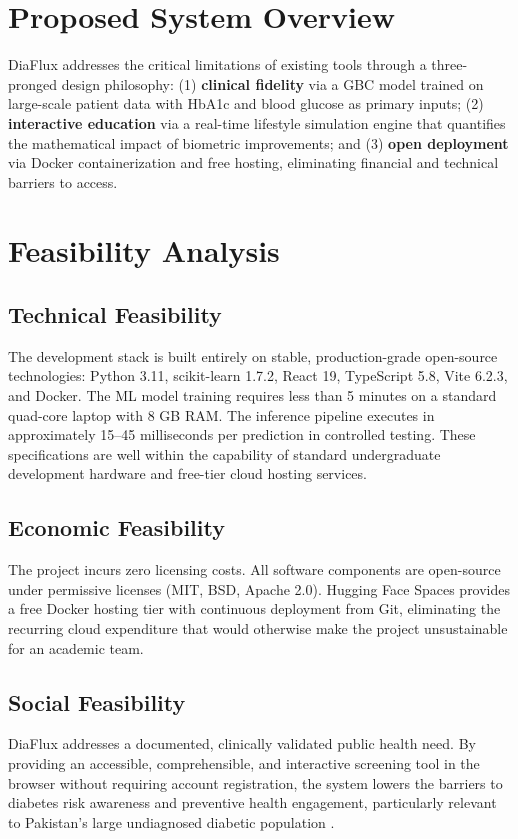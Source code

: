 \documentclass[12pt,a4paper]{report}
\begin{document}
\section{Proposed System Overview}
DiaFlux addresses the critical limitations of existing tools through a three-pronged design philosophy: (1) \textbf{clinical fidelity} via a GBC model trained on large-scale patient data with HbA1c and blood glucose as primary inputs; (2) \textbf{interactive education} via a real-time lifestyle simulation engine that quantifies the mathematical impact of biometric improvements; and (3) \textbf{open deployment} via Docker containerization and free hosting, eliminating financial and technical barriers to access.

\section{Feasibility Analysis}

\subsection{Technical Feasibility}
The development stack is built entirely on stable, production-grade open-source technologies: Python 3.11, scikit-learn 1.7.2, React 19, TypeScript 5.8, Vite 6.2.3, and Docker. The ML model training requires less than 5 minutes on a standard quad-core laptop with 8 GB RAM. The inference pipeline executes in approximately 15--45 milliseconds per prediction in controlled testing. These specifications are well within the capability of standard undergraduate development hardware and free-tier cloud hosting services.

\subsection{Economic Feasibility}
The project incurs zero licensing costs. All software components are open-source under permissive licenses (MIT, BSD, Apache 2.0). Hugging Face Spaces provides a free Docker hosting tier with continuous deployment from Git, eliminating the recurring cloud expenditure that would otherwise make the project unsustainable for an academic team.

\subsection{Social Feasibility}
DiaFlux addresses a documented, clinically validated public health need. By providing an accessible, comprehensible, and interactive screening tool in the browser without requiring account registration, the system lowers the barriers to diabetes risk awareness and preventive health engagement, particularly relevant to Pakistan's large undiagnosed diabetic population \cite{ndi_pak_report}.
\end{document}
